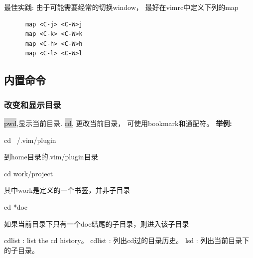 \documentclass[oneside,openany]{book}
\begin{document}
  \begin{mdframed}[style=BestPracticeFrame]
  最佳实践: 由于可能需要经常的切换window， 最好在vimrc中定义下列的map
    \begin{verbatim}
      map <C-j> <C-W>j
      map <C-k> <C-W>k
      map <C-h> <C-W>h
      map <C-l> <C-W>l
    \end{verbatim}
  \end{mdframed}


  \subsection{内置命令}

  \subsubsection{改变和显示目录}
    \colorbox{lightgray}{pwd},显示当前目录.  \colorbox{lightgray}{cd}, 更改当前目录， 可使用bookmark和通配符。
    \newline
    \textbf{举例:}
    \begin{mdframed}[style=SmallFrame] cd ~/.vim/plugin \end{mdframed}
    \vspace{0.1mm}
    到home目录的.vim/plugin目录

    \begin{mdframed}[style=SmallFrame] cd work/project \end{mdframed}
    \vspace{0.1mm}
     其中work是定义的一个书签，并非子目录

    \begin{mdframed}[style=SmallFrame] cd *doc \end{mdframed}
    \vspace{0.1mm}
     如果当前目录下只有一个doc结尾的子目录，则进入该子目录

    cdlist   : list the cd history。
    \newline
    cdlist   : 列出cd过的目录历史。
    \newline
    lsd      : 列出当前目录下的子目录。
\end{document}
